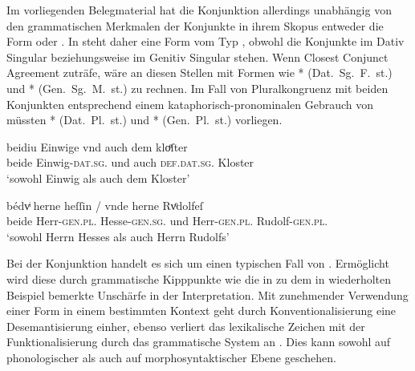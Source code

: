 Im vorliegenden Belegmaterial hat die Konjunktion allerdings unabhängig von den
grammatischen Merkmalen der Konjunkte in ihrem Skopus entweder die Form
 oder . In  steht daher eine
Form vom Typ , obwohl die Konjunkte im Dativ Singular
 beziehungsweise im Genitiv Singular
 stehen. Wenn Closest Conjunct Agreement zuträfe, wäre an diesen Stellen mit Formen wie
* (Dat.~Sg.~F.~st.) und * (Gen.~Sg.~M.~st.) zu
rechnen. Im Fall von Pluralkongruenz mit beiden Konjunkten entsprechend einem
kataphorisch-pronominalen Gebrauch von
 müssten * (Dat.\ Pl.\ st.) und *
(Gen.\ Pl.\ st.) vorliegen.

\begin{exe}
\ex \label{ex:caoconjbeide}
	\begin{xlist}
	\ex \label{ex:caoconjbeide_1}
		\gll beidiu Einwige vnd auch dem kloͤſter \\
				beide Einwig-\textsc{dat.sg.\FemF} und auch
				\textsc{def.dat.sg.\NeutM} Kloster \\
		\trans `sowohl Einwig als auch dem Kloster'
			\parencites(Nr.~2925, Landshut, 1298)[219,34]{cao4}

	\ex \label{ex:caoconjbeide_2}
		\gll bédvͥ herne heſſin / vnde herne Rvͦdolfeſ \\
			beide Herr-\textsc{gen.pl.\MascM} Hesse-\textsc{gen.sg.\MascM} {}
				und Herr-\textsc{gen.pl.\MascM} Rudolf-\textsc{gen.pl.\MascM}
				\\
		\trans `sowohl Herrn Hesses als auch Herrn Rudolfs'
			\parencites(Nr.~1318, Freiburg i.\,Br., 1290)[561,11--12]{cao2}
	\end{xlist}
\end{exe}

Bei der Konjunktion  handelt es sich um einen typischen Fall von
 \autocite[vgl.][134--188]{lehmann2015}. Ermöglicht
wird diese durch grammatische Kipppunkte wie die in 
zu dem in  wiederholten Beispiel bemerkte Unschärfe
in der Interpretation. Mit zunehmender Verwendung einer Form in einem
bestimmten Kontext geht durch Konventionalisierung eine Desemantisierung
einher, ebenso verliert das lexikalische Zeichen mit der Funktionalisierung
durch das grammatische System an . Dies kann sowohl auf
phonologischer als auch auf morphosyntaktischer Ebene geschehen.

